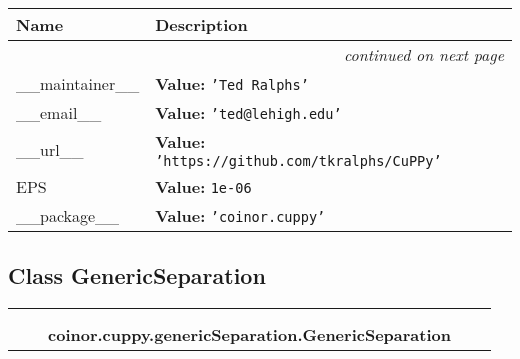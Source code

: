     \vspace{-1cm}
\hspace{\varindent}\begin{longtable}{|p{\varnamewidth}|p{\vardescrwidth}|l}
\cline{1-2}
\cline{1-2} \centering \textbf{Name} & \centering \textbf{Description}& \\
\cline{1-2}
\endhead\cline{1-2}\multicolumn{3}{r}{\small\textit{continued on next page}}\\\endfoot\cline{1-2}
\endlastfoot\raggedright \_\-\_\-m\-a\-i\-n\-t\-a\-i\-n\-e\-r\-\_\-\_\- & \raggedright \textbf{Value:} 
{\tt \texttt{'}\texttt{Ted Ralphs}\texttt{'}}&\\
\cline{1-2}
\raggedright \_\-\_\-e\-m\-a\-i\-l\-\_\-\_\- & \raggedright \textbf{Value:} 
{\tt \texttt{'}\texttt{ted@lehigh.edu}\texttt{'}}&\\
\cline{1-2}
\raggedright \_\-\_\-u\-r\-l\-\_\-\_\- & \raggedright \textbf{Value:} 
{\tt \texttt{'}\texttt{https://github.com/tkralphs/CuPPy}\texttt{'}}&\\
\cline{1-2}
\raggedright E\-P\-S\- & \raggedright \textbf{Value:} 
{\tt 1e-06}&\\
\cline{1-2}
\raggedright \_\-\_\-p\-a\-c\-k\-a\-g\-e\-\_\-\_\- & \raggedright \textbf{Value:} 
{\tt \texttt{'}\texttt{coinor.cuppy}\texttt{'}}&\\
\cline{1-2}
\end{longtable}



\subsection{Class GenericSeparation}

    \label{coinor:cuppy:genericSeparation:GenericSeparation}
\begin{tabular}{cccccc}
\multicolumn{2}{r}{\settowidth{\BCL}{object}\multirow{2}{\BCL}{object}}
&&
  \\\cline{3-3}
  &&\multicolumn{1}{c|}{}
&&
  \\
&&\multicolumn{2}{l}{\textbf{coinor.cuppy.genericSeparation.GenericSeparation}}
\end{tabular}


